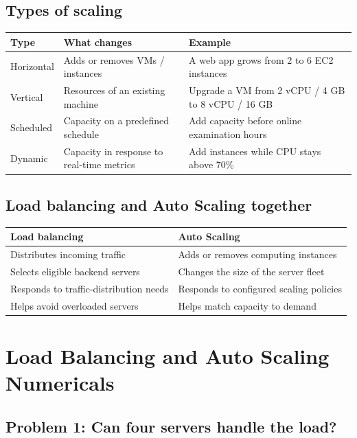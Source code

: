 \documentclass[11pt,a4paper]{article}
\begin{document}
\subsection{Types of scaling}

\begin{tabularx}{\textwidth}{@{}lXX@{}}
\toprule
\rowcolor{tablehead}\textbf{Type} & \textbf{What changes} & \textbf{Example} \\
\midrule
Horizontal & Adds or removes VMs / instances & A web app grows from 2 to 6 EC2 instances \\
\addlinespace
Vertical & Resources of an existing machine & Upgrade a VM from 2 vCPU / 4 GB to 8 vCPU / 16
  GB \\
\addlinespace
Scheduled & Capacity on a predefined schedule & Add capacity before online examination
  hours \\
\addlinespace
Dynamic & Capacity in response to real-time metrics & Add instances while CPU stays above
  70\% \\
\bottomrule
\end{tabularx}


\subsection{Load balancing and Auto Scaling together}

\begin{tabularx}{\textwidth}{@{}XX@{}}
\toprule
\rowcolor{tablehead}\textbf{Load balancing} & \textbf{Auto Scaling} \\
\midrule
Distributes incoming traffic & Adds or removes computing instances \\
Selects eligible backend servers & Changes the size of the server fleet \\
Responds to traffic-distribution needs & Responds to configured scaling policies \\
Helps avoid overloaded servers & Helps match capacity to demand \\
\bottomrule
\end{tabularx}

\section{Load Balancing and Auto Scaling Numericals}

\subsection*{Problem 1: Can four servers handle the load?}
\end{document}
